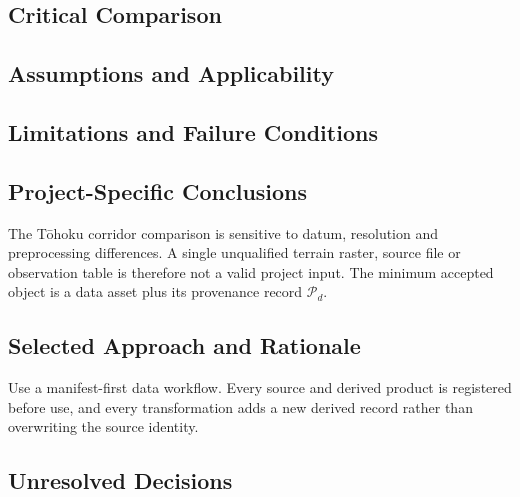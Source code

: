 
\subsection{Critical Comparison}
\label{sec:res-dat-unc-critical-comparison}


\subsection{Assumptions and Applicability}
\label{sec:res-dat-unc-assumptions}


\subsection{Limitations and Failure Conditions}
\label{sec:res-dat-unc-limitations}


\subsection{Project-Specific Conclusions}
\label{sec:res-dat-unc-conclusions}

The Tōhoku corridor comparison is sensitive to datum, resolution and
preprocessing differences. A single unqualified terrain raster, source
file or observation table is therefore not a valid project input. The
minimum accepted object is a data asset plus its provenance record
\(\mathcal{P}_{d}\).

\subsection{Selected Approach and Rationale}
\label{sec:res-dat-unc-selected-approach}

Use a manifest-first data workflow. Every source and derived product is
registered before use, and every transformation adds a new derived
record rather than overwriting the source identity.

\subsection{Unresolved Decisions}
\label{sec:res-dat-unc-unresolved-decisions}

